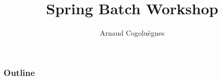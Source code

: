 \documentclass{beamer}
\title{Spring Batch Workshop}
\author{Arnaud Cogoluègnes}
\institute{Consultant with Zenika, Co-author Spring Batch in Action}
\begin{document}
\begin{frame}
\titlepage
\end{frame}

\begin{frame}
 \frametitle{Outline}
 \scriptsize{\tableofcontents}
\end{frame}



















\end{document}
